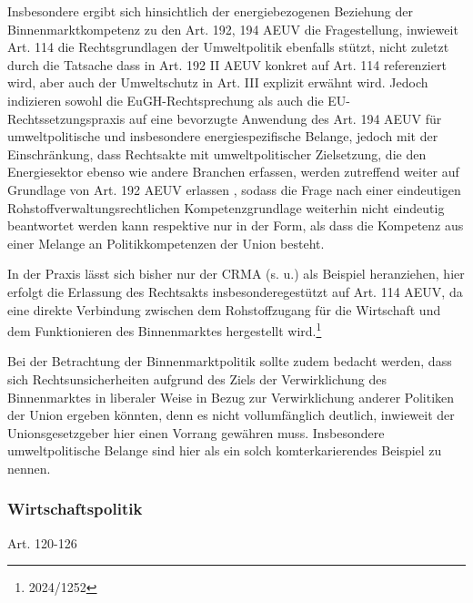 \documentclass[12pt,a4paper,oneside]{book} %
\begin{document}
	Insbesondere ergibt sich hinsichtlich der energiebezogenen Beziehung der Binnenmarktkompetenz zu den Art. 192, 194 AEUV die Fragestellung, inwieweit Art. 114 die Rechtsgrundlagen der Umweltpolitik ebenfalls stützt, nicht zuletzt durch die Tatsache dass in Art. 192 II AEUV konkret auf Art. 114 referenziert wird, aber auch der Umweltschutz in Art. III explizit erwähnt wird.\autocite[siehe insbesondere hierzu Gundel §m Rn 28f]{dauses_handbuch_2024} Jedoch indizieren sowohl die EuGH-Rechtsprechung als auch die EU-Rechtssetzungspraxis auf eine bevorzugte Anwendung des Art. 194 AEUV für umweltpolitische und insbesondere energiespezifische Belange, jedoch mit der Einschränkung, dass \glqq Rechtsakte mit umweltpolitischer Zielsetzung, die den Energiesektor ebenso wie andere Branchen erfassen, werden zutreffend weiter auf Grundlage von Art. 192 AEUV erlassen \grqq\autocite[Gundel §m Rn 29]{dauses_handbuch_2024}, sodass die Frage nach einer eindeutigen Rohstoffverwaltungsrechtlichen Kompetenzgrundlage weiterhin nicht eindeutig beantwortet werden kann respektive nur in der Form, als dass die Kompetenz aus einer Melange an Politikkompetenzen der Union besteht.
	
	In der Praxis lässt sich bisher nur der CRMA (s. u.) als Beispiel heranziehen, hier erfolgt die Erlassung des Rechtsakts \grqq insbesondere\glqq gestützt auf Art. 114 AEUV, da eine direkte Verbindung zwischen dem Rohstoffzugang für die Wirtschaft und dem Funktionieren des Binnenmarktes hergestellt wird.\footnote{2024/1252}
	
	Bei der Betrachtung der Binnenmarktpolitik sollte zudem bedacht werden, dass sich Rechtsunsicherheiten aufgrund des Ziels der Verwirklichung des Binnenmarktes in liberaler Weise in Bezug zur Verwirklichung anderer Politiken der Union ergeben könnten, denn es nicht vollumfänglich deutlich, inwieweit der Unionsgesetzgeber hier einen Vorrang gewähren muss.\autocite[§23 Rn 10]{classen_europarecht_2021} Insbesondere umweltpolitische Belange sind hier als ein solch komterkarierendes Beispiel zu nennen.
	
	\subsubsection{Wirtschaftspolitik}
	Art. 120-126
	
	
\end{document}
